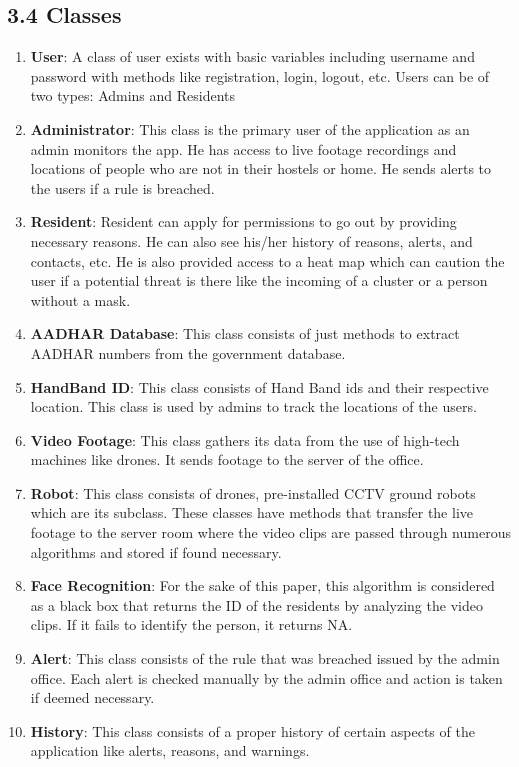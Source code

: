 \documentclass[eng]{FCEFyN-class}
\begin{document}
\subsection{3.4 Classes}
\begin{enumerate}
    \item \textbf{User}: A class of user exists with basic variables including username and password with methods like registration, login, logout, etc. Users can be of two types: Admins and Residents
    \item \textbf{Administrator}: This class is the primary user of the application as an admin monitors the app. He has access to live footage recordings and locations of people who are not in their hostels or home. He sends alerts to the users if a rule is breached.
    \item \textbf{Resident}: Resident can apply for permissions to go out by providing necessary reasons. He can also see his/her history of reasons, alerts, and contacts, etc. He is also provided access to a heat map which can caution the user if a potential threat is there like the incoming of a cluster or a person without a mask.
    
    \item \textbf{AADHAR Database}: This class consists of just methods to extract AADHAR numbers from the government database.
    \item \textbf{HandBand ID}: This class consists of Hand Band ids and their respective location. This class is used by admins to track the locations of the users.
    \item \textbf{Video Footage}: This class gathers its data from the use of high-tech machines like drones. It sends footage to the server of the office.
    \item \textbf{Robot}: This class consists of drones, pre-installed CCTV ground robots which are its subclass. These classes have methods that transfer the live footage to the server room where the video clips are passed through numerous algorithms and stored if found necessary.
    \item \textbf{Face Recognition}: For the sake of this paper, this algorithm is considered as a black box that returns the ID of the residents by analyzing the video clips. If it fails to identify the person, it returns NA.
    \item \textbf{Alert}: This class consists of the rule that was breached issued by the admin office. Each alert is checked manually by the admin office and action is taken if deemed necessary.
    \item \textbf{History}: This class consists of a proper history of certain aspects of the application like alerts, reasons, and warnings.
\end{enumerate}
\end{document}

